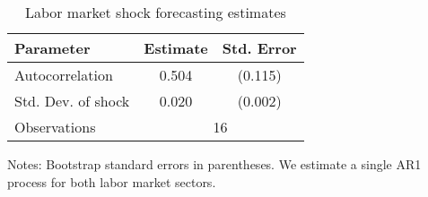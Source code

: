 \begin{table}[ht]
\caption{Labor market shock forecasting estimates}
\label{tab:wageAR1s}
\centering
\begin{threeparttable}
\begin{tabular}{lcc}
\toprule
Parameter & Estimate & Std. Error \\ 
\midrule
Autocorrelation & 0.504 & (0.115) \\ 
Std. Dev. of shock & 0.020 & (0.002) \\ 
\midrule
Observations & \multicolumn{2}{c}{16} \\ 
\bottomrule
\end{tabular}
\footnotesize Notes: Bootstrap standard errors in parentheses. We estimate a single AR1 process for both labor market sectors.
\end{threeparttable}
\end{table}

